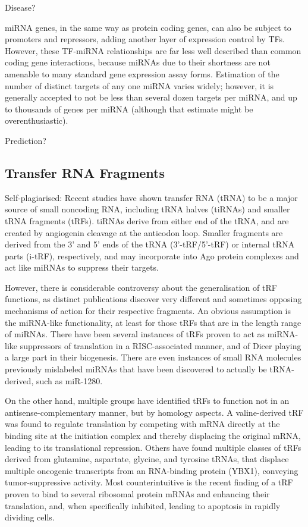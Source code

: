 Disease?

miRNA genes, in the same way as protein coding genes, can also be subject to promoters and repressors, adding another layer of expression control by TFs. However, these TF-miRNA relationships are far less well described than common coding gene interactions, because miRNAs due to their shortness are not amenable to many standard gene expression assay forms. Estimation of the number of distinct targets of any one miRNA varies widely; however, it is generally accepted to not be less than several dozen targets per miRNA, and up to thousands of genes per miRNA (although that estimate might be overenthusiastic).

Prediction?

\subsection{Transfer RNA Fragments}
Self-plagiarised: Recent studies have shown transfer RNA (tRNA) to be a major source of small noncoding RNA\cite{Cole2009,Lee2009}, including tRNA halves (tiRNAs) and smaller tRNA fragments (tRFs). tiRNAs derive from either end of the tRNA, and are created by angiogenin cleavage at the anticodon loop\cite{Yamasaki2009,Ivanov2011}. Smaller fragments are derived from the 3’ and 5’ ends of the tRNA (3'-tRF/5'-tRF) or internal tRNA parts (i-tRF), respectively, and may incorporate into Ago protein complexes and act like miRNAs to suppress their targets\cite{Burroughs2011,Kumar2014}.

However, there is considerable controversy about the generalisation of tRF functions, as distinct publications discover very different and sometimes opposing mechanisms of action for their respective fragments. An obvious assumption is the miRNA-like functionality, at least for those tRFs that are in the length range of miRNAs. There have been several instances of tRFs proven to act as miRNA-like suppressors of translation in a RISC-associated manner\cite{Kumar2014}, and of Dicer playing a large part in their biogenesis\cite{Cole2009}. There are even instances of small RNA molecules previously mislabeled miRNAs that have been discovered to actually be tRNA-derived, such as miR-1280\cite{Huang2017}.

On the other hand, multiple groups have identified tRFs to function not in an antisense-complementary manner, but by homology aspects. A valine-derived tRF was found to regulate translation by competing with mRNA directly at the binding site at the initiation complex and thereby displacing the original mRNA, leading to its translational repression\cite{Gebetsberger2017}. Others have found multiple classes of tRFs derived from glutamine, aspartate, glycine, and tyrosine tRNAs, that displace multiple oncogenic transcripts from an RNA-binding protein (YBX1), conveying tumor-suppressive activity\cite{Goodarzi2015}. Most counterintuitive is the recent finding of a tRF proven to bind to several ribosomal protein mRNAs and enhancing their translation, and, when specifically inhibited, leading to apoptosis in rapidly dividing cells\cite{Kim2017}.  

